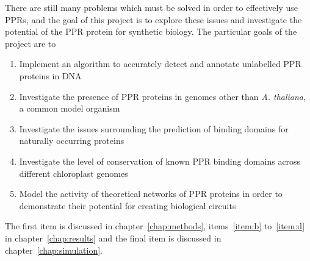 There are still many problems which must be solved in order to effectively use
PPRs, and the goal of this project is to explore these issues and investigate
the potential of the PPR protein for synthetic biology.
The particular goals of the project are to
\begin{enumerate}
  \item \label{item:a}
    Implement an algorithm to accurately detect and annotate unlabelled PPR
    proteins in DNA
  \item \label{item:b}
    Investigate the presence of PPR proteins in genomes other than 
    \emph{A. thaliana}, a common model organism
  \item \label{item:c}
    Investigate the issues surrounding the prediction of binding domains
    for naturally occurring proteins
  \item \label{item:d}
    Investigate the level of conservation of known PPR binding domains
    across different chloroplast genomes
  \item \label{item:e} 
    Model the activity of theoretical networks of PPR proteins in order to
    demonstrate their potential for creating biological circuits
\end{enumerate}

The first item is discussed in chapter~\ref{chap:methods}, items~\ref{item:b}
to~\ref{item:d} in chapter~\ref{chap:results} and the final item is discussed
in chapter~\ref{chap:simulation}.

